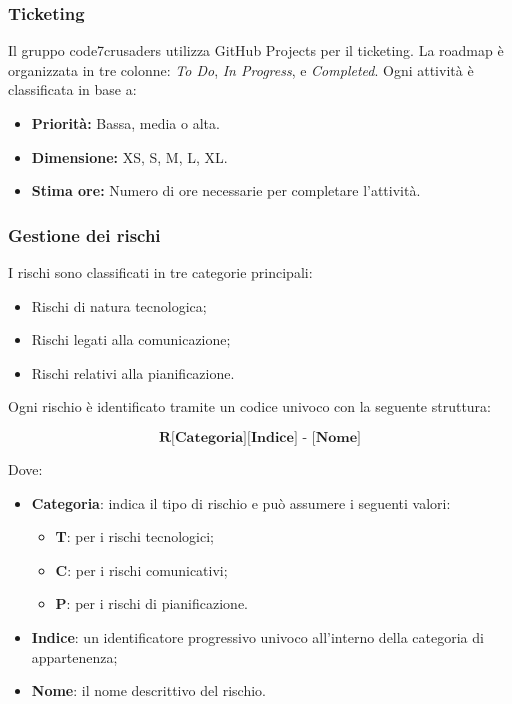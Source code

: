 \subsubsection{Ticketing}
Il gruppo code7crusaders utilizza GitHub Projects per il ticketing. La roadmap è organizzata in tre colonne: \textit{To Do}, \textit{In Progress}, e \textit{Completed}. Ogni attività è classificata in base a:
\begin{itemize}
    \item \textbf{Priorità:} Bassa, media o alta.
    \item \textbf{Dimensione:} XS, S, M, L, XL.
    \item \textbf{Stima ore:} Numero di ore necessarie per completare l’attività.
\end{itemize}

\subsubsection{Gestione dei rischi}
I rischi sono classificati in tre categorie principali:
\begin{itemize}
    \item Rischi di natura tecnologica;
    \item Rischi legati alla comunicazione;
    \item Rischi relativi alla pianificazione.
\end{itemize}

Ogni rischio è identificato tramite un codice univoco con la seguente struttura:

\[
\textbf{R[Categoria][Indice] - [Nome]}
\]

Dove:
\begin{itemize}
    \item \textbf{Categoria}: indica il tipo di rischio e può assumere i seguenti valori:
    \begin{itemize}
        \item \textbf{T}: per i rischi tecnologici;
        \item \textbf{C}: per i rischi comunicativi;
        \item \textbf{P}: per i rischi di pianificazione.
    \end{itemize}
    \item \textbf{Indice}: un identificatore progressivo univoco all'interno della categoria di appartenenza;
    \item \textbf{Nome}: il nome descrittivo del rischio.
\end{itemize}

